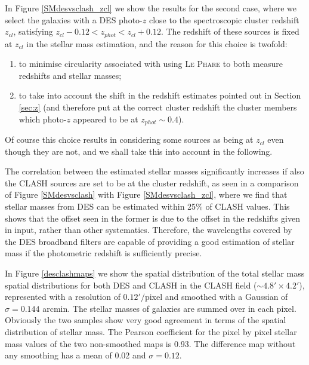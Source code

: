 {In Figure \ref{SMdesvsclash_zcl} we show the results for the second case, where we select the galaxies with a DES photo-$z$ close to the spectroscopic cluster redshift $z_{cl}$, satisfying $z_{cl}-0.12<z_{phot}<z_{cl}+0.12$. The redshift of these sources is fixed at $z_{cl}$ in the stellar mass estimation, and the reason for this choice is twofold:
\begin{enumerate}
\item to minimise circularity associated with using \textsc{Le Phare} to both measure redshifts and stellar masses;
\item to take into account the shift in the redshift estimates pointed out in Section \ref{sec:z} (and therefore put at the correct cluster redshift the cluster members which photo-$z$ appeared to be at $z_{phot}\sim 0.4$).
\end{enumerate}

Of course this choice results in considering some sources as being at $z_{cl}$ even though they are not, and we shall take this into account in the following. 

The correlation between the estimated stellar masses significantly increases if also the CLASH sources are set to be at the cluster redshift, as seen in a comparison of Figure \ref{SMdesvsclash} with Figure \ref{SMdesvsclash_zcl}, where we find that stellar masses from DES can be estimated within 25\% of CLASH values. This shows that the offset seen in the former is due to the offset in the redshifts given in input, rather than other systematics. Therefore, the wavelengths covered by the DES broadband filters are capable of providing a good estimation of stellar mass if the photometric redshift is sufficiently precise. 

In Figure \ref{desclashmaps} we show the spatial distribution of the total stellar mass spatial distributions for both DES and CLASH in the CLASH field ($\sim 4.8'\times 4.2'$), represented with a resolution of $0.12'/$pixel and smoothed with a Gaussian of $\sigma=0.144$ arcmin. The stellar masses of galaxies are summed over in each pixel.
Obviously the two samples show very good agreement in terms of the spatial distribution of stellar mass. The Pearson coefficient for the pixel by pixel stellar mass values of the two non-smoothed maps is 0.93. The difference map without any smoothing has a mean of 0.02 and $\sigma=0.12$.

}
